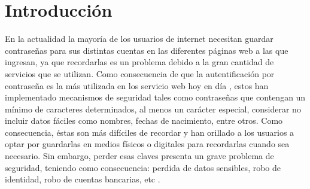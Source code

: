 \documentclass[12pt, a4paper, titlepage]{report}
\begin{document}
	\begin{appendix}
		\renewcommand*\contentsname{{\textcolor{azulescom}{Índice.}}}
		\tableofcontents
		\newpage
		\renewcommand*\listfigurename{{\textcolor{azulescom}{Índice de figuras.}}}
		\listoffigures
		\newpage
		\newpage
		\renewcommand*\listtablename{{\textcolor{azulescom}{Índice de cuadros.}}}
		\listoftables
		
		\newpage
		\renewcommand*\glossaryname{{\textcolor{azulescom}{Glosario.}}}
		
		\printglossary
	\end{appendix}
	
    
    \renewcommand\thechapter{\arabic{chapter}}
    \renewcommand{\appendixname}{Capítulo}
    
    \chapter{\textcolor{azulescom}{Introducción}}
		En la actualidad la mayor\'ia de los usuarios de internet necesitan guardar contraseñas para sus distintas cuentas en las diferentes páginas web a las que ingresan, ya que recordarlas es un problema debido a la gran cantidad de servicios que se utilizan. Como consecuencia de que la autentificaci\'on por contraseña es la más utilizada en los servicio web hoy en día \cite{ComparisonAuthenticationMethodsResources}, estos han implementado mecanismos de seguridad tales como contraseñas que contengan un mínimo de caracteres determinados, al menos un carácter especial, considerar no incluir datos fáciles como nombres, fechas de nacimiento, entre otros. Como consecuencia, éstas son más difíciles de recordar y han orillado a los usuarios a optar por guardarlas en medios físicos o digitales para recordarlas cuando sea necesario. 
		Sin embargo, perder esas claves presenta un grave problema de seguridad, teniendo como consecuencia: perdida de datos sensibles, robo de identidad, robo de cuentas bancarias, etc \cite{refRoboIdentidad}.\\
		
\end{document}
